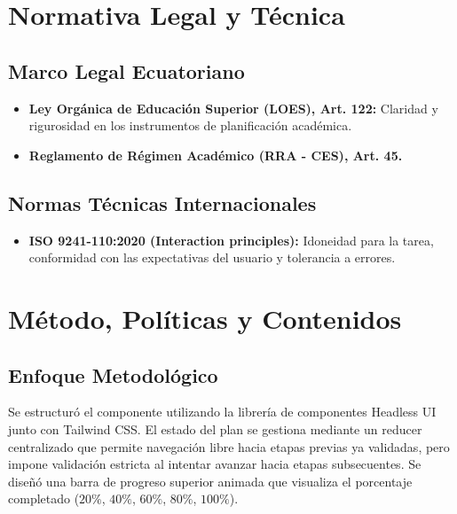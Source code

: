 \documentclass[12pt,a4paper]{article}
\begin{document}
\section{Normativa Legal y Técnica}
\subsection{Marco Legal Ecuatoriano}
\begin{itemize}[leftmargin=1.5em, itemsep=2pt]
    \item \textbf{Ley Orgánica de Educación Superior (LOES), Art. 122:} Claridad y rigurosidad en los instrumentos de planificación académica.
    \item \textbf{Reglamento de Régimen Académico (RRA - CES), Art. 45.}
\end{itemize}
\subsection{Normas Técnicas Internacionales}
\begin{itemize}[leftmargin=1.5em, itemsep=2pt]
    \item \textbf{ISO 9241-110:2020 (Interaction principles):} Idoneidad para la tarea, conformidad con las expectativas del usuario y tolerancia a errores.
\end{itemize}

\section{Método, Políticas y Contenidos}
\subsection{Enfoque Metodológico}
Se estructuró el componente utilizando la librería de componentes Headless UI junto con Tailwind CSS. El estado del plan se gestiona mediante un reducer centralizado que permite navegación libre hacia etapas previas ya validadas, pero impone validación estricta al intentar avanzar hacia etapas subsecuentes. Se diseñó una barra de progreso superior animada que visualiza el porcentaje completado ($20\%$, $40\%$, $60\%$, $80\%$, $100\%$).
\end{document}
